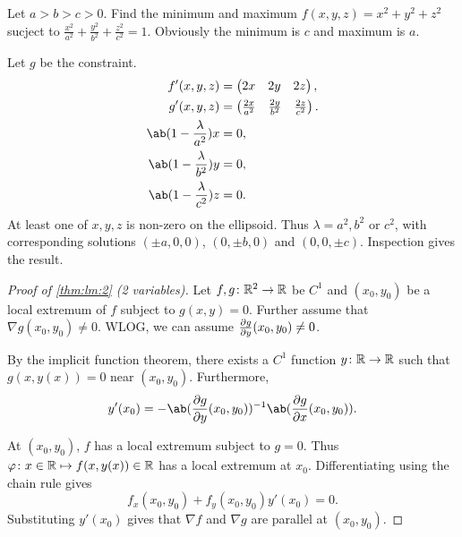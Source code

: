 \begin{example}
    Let $a > b > c > 0$.
    Find the minimum and maximum $f(x, y, z) = x^2 + y^2 + z^2$ sucject to
    $\frac{x^2}{a^2} + \frac{y^2}{b^2} + \frac{z^2}{c^2} = 1$.
    Obviously the minimum is $c$ and maximum is $a$.

    Let $g$ be the constraint.
    \begin{align*}
        f'(x, y, z) &= \begin{pmatrix}
            2x & 2y & 2z
        \end{pmatrix}, \\
        g'(x, y, z) &= \begin{pmatrix}
            \frac{2x}{a^2} & \frac{2y}{b^2} & \frac{2z}{c^2}
        \end{pmatrix}. \\
        \ab(1 - \frac{\lambda}{a^2}) x &= 0, \\
        \ab(1 - \frac{\lambda}{b^2}) y &= 0, \\
        \ab(1 - \frac{\lambda}{c^2}) z &= 0.
    \end{align*}
    At least one of $x, y, z$ is non-zero on the ellipsoid.
    Thus $\lambda = a^2, b^2$ or $c^2$, with corresponding solutions
    $(\pm a, 0, 0)$, $(0, \pm b, 0)$ and $(0, 0, \pm c)$.
    Inspection gives the result.
\end{example}

\begin{proof}[Proof of \cref{thm:lm:2} (2 variables)]
    Let $f, g\colon \mathbb{R}^2 \to \mathbb{R}$ be $C^1$ and $(x_0, y_0)$ be a local
    extremum of $f$ subject to $g(x, y) = 0$.
    Further assume that $\nabla g(x_0, y_0) \ne 0$.
    WLOG, we can assume $\pdv{g}{y}(x_0, y_0) \ne 0$.

    By the implicit function theorem, there exists a $C^1$ function
    $y\colon \mathbb{R} \to \mathbb{R}$ such that $g(x, y(x)) = 0$ near $(x_0, y_0)$.
    Furthermore, \[
        y'(x_0) = -\ab(\pdv{g}{y}(x_0, y_0))^{-1}\ab(\pdv{g}{x}(x_0, y_0)).
    \]

    At $(x_0, y_0)$, $f$ has a local extremum subject to $g = 0$.
    Thus $\varphi\colon x \in \mathbb{R} \mapsto f(x, y(x)) \in \mathbb{R}$ has a local
    extremum at $x_0$.
    Differentiating using the chain rule gives \[
        f_x(x_0, y_0) + f_y(x_0, y_0)y'(x_0) = 0.
    \] Substituting $y'(x_0)$ gives that $\nabla f$ and $\nabla g$ are
    parallel at $(x_0, y_0)$.
\end{proof}

